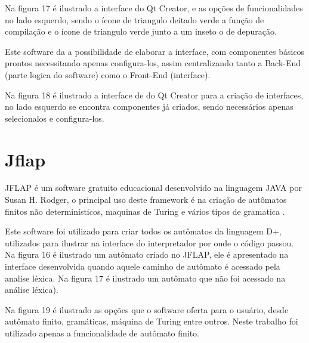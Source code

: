 \documentclass[12pt,oneside,a4paper,chapter=TITLE,section=TITLE,sumario=tradicional]{abntex2}
\begin{document}
Na figura 17 é ilustrado a interface do Qt Creator, e as opções de funcionalidades no lado esquerdo, sendo o ícone de triangulo deitado verde a função de compilação e o ícone de triangulo verde junto a um inseto o de depuração.

\begin{figure}[htb]
\end{figure} 

Este software da a possibilidade de elaborar a interface, com componentes básicos prontos necessitando apenas configura-los, assim centralizando tanto a Back-End (parte logica do software) como o Front-End (interface). 

Na figura 18 é ilustrado a interface de do Qt Creator para a criação de interfaces, no lado esquerdo se encontra componentes já criados, sendo necessários apenas selecionalos e configura-los.

\begin{figure}[htb]
\end{figure} 

\section{Jflap}
\label{sec:jflap}

JFLAP é um software gratuito educacional desenvolvido na linguagem JAVA por Susan H. Rodger, o principal uso deste framework é na criação de autômatos finitos não determinísticos, maquinas de Turing e vários tipos de gramatica \cite{susan2005}.

Este software foi utilizado para criar todos os autômatos da linguagem D+, utilizados para ilustrar na interface do interpretador por onde o código passou. Na figura 16 é ilustrado um autômato criado no JFLAP, ele é apresentado na interface desenvolvida quando aquele caminho de autômato é acessado pela analise léxica. Na figura 17 é ilustrado um autômato que não foi acessado na análise léxica).

Na figura 19 é ilustrado as opções que o software oferta para o usuário, desde autômato finito, gramáticas, máquina de Turing entre outros. Neste trabalho foi utilizado apenas a funcionalidade de autômato finito.

\begin{figure}[htb]
\end{figure} 
\end{document}
